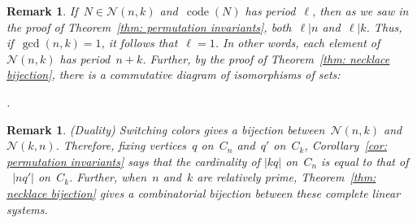 \documentclass{amsart}
\newtheorem{Remark}[thm]{Remark}
\newenvironment{remark}
  {\begin{Remark}\rm}{\end{Remark}}
\DeclareMathOperator{\code}{code}
\newcommand{\neck}{\mathcal{N}}
\begin{document}
\begin{remark}  If~$N\in\neck(n,k)$ and~$\code(N)$ has period~$\ell$, then as we
  saw in the proof of Theorem~\ref{thm: permutation invariants}, both~$\ell|n$
  and~$\ell|k$.  Thus, if~$\gcd(n,k)=1$, it follows that~$\ell=1$.  In other
  words, each element of~$\neck(n,k)$ has period~$n+k$.  Further, by the
  proof of Theorem~\ref{thm: necklace bijection}, there is a commutative
  diagram of isomorphisms of sets:
  \begin{center}
    .
  \end{center}
\end{remark}

\begin{remark}  (Duality) Switching colors gives a bijection
  between~$\neck(n,k)$ and~$\neck(k,n)$.  Therefore, fixing vertices~$q$
  on~$C_n$ and~$q'$ on~$C_k$, Corollary~\ref{cor: permutation invariants} says
  that the cardinality of $|kq|$ on~$C_n$ is equal to that of ~$|nq'|$ on~$C_k$.  Further, when~$n$
  and~$k$ are relatively prime, Theorem~\ref{thm: necklace bijection} gives a
  combinatorial bijection between these complete linear systems.
\end{remark}
\end{document}
